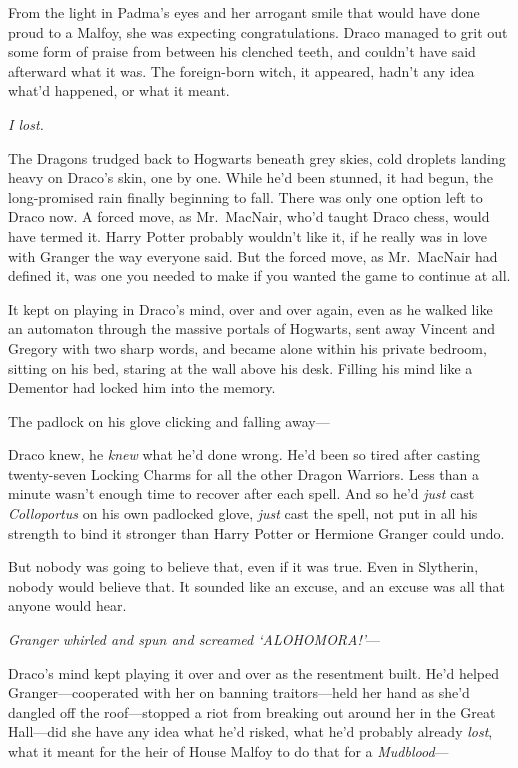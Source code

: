 From the light in Padma's eyes and her arrogant smile that would have done
proud to a Malfoy, she was expecting congratulations. Draco managed to grit out
some form of praise from between his clenched teeth, and couldn't have said
afterward what it was. The foreign-born witch, it appeared, hadn't any idea
what'd happened, or what it meant.

\emph{I lost.}

The Dragons trudged back to Hogwarts beneath grey skies, cold droplets landing
heavy on Draco's skin, one by one. While he'd been stunned, it had begun, the
long-promised rain finally beginning to fall. There was only one option left to
Draco now. A forced move, as Mr.~MacNair, who'd taught Draco chess, would have
termed it. Harry Potter probably wouldn't like it, if he really was in love
with Granger the way everyone said. But the forced move, as Mr.~MacNair had
defined it, was one you needed to make if you wanted the game to continue at
all.

It kept on playing in Draco's mind, over and over again, even as he walked like
an automaton through the massive portals of Hogwarts, sent away Vincent and
Gregory with two sharp words, and became alone within his private bedroom,
sitting on his bed, staring at the wall above his desk. Filling his mind like a
Dementor had locked him into the memory.

The padlock on his glove clicking and falling away—

Draco knew, he \emph{knew} what he'd done wrong. He'd been so tired after
casting twenty-seven Locking Charms for all the other Dragon Warriors. Less
than a minute wasn't enough time to recover after each spell. And so he'd
\emph{just} cast \emph{Colloportus} on his own padlocked glove, \emph{just}
cast the spell, not put in all his strength to bind it stronger than Harry
Potter or Hermione Granger could undo.

But nobody was going to believe that, even if it was true. Even in Slytherin,
nobody would believe that. It sounded like an excuse, and an excuse was all
that anyone would hear.

\emph{Granger whirled and spun and screamed `ALOHOMORA!'}—

Draco's mind kept playing it over and over as the resentment built. He'd helped
Granger—cooperated with her on banning traitors—held her hand as she'd
dangled off the roof—stopped a riot from breaking out around her in the Great
Hall—did she have any idea what he'd risked, what he'd probably already
\emph{lost}, what it meant for the heir of House Malfoy to do that for a
\emph{Mudblood}—

